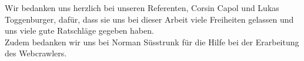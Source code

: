 Wir bedanken uns herzlich bei unseren Referenten, Corsin Capol und Lukas Toggenburger, dafür, dass sie uns bei dieser Arbeit viele Freiheiten gelassen und uns viele gute Ratschläge gegeben haben.\\
Zudem bedanken wir uns bei Norman Süsstrunk für die Hilfe bei der Erarbeitung des Webcrawlers.